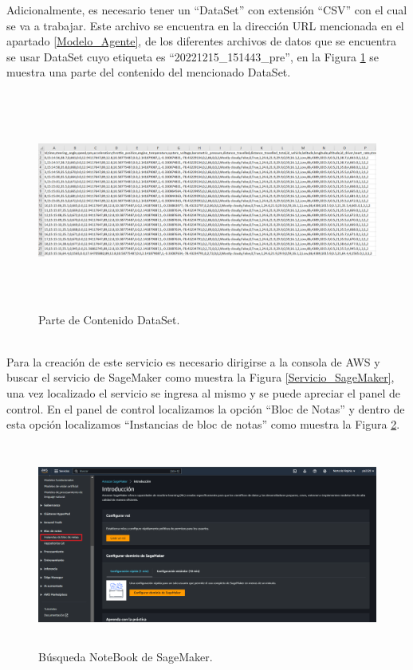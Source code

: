 \documentclass[a4paper,10pt, oneside, titlepage]{article}
\begin{document}
	 \indent Adicionalmente, es necesario tener un ``DataSet'' con extensión ``CSV'' con el cual se va a trabajar. Este archivo se encuentra en la dirección URL mencionada en el apartado \ref{Modelo_Agente}, de los diferentes archivos de datos que se encuentra se usar DataSet cuyo etiqueta es ``20221215\_151443\_pre'', en la Figura \ref{Dataset_Sagemaker} se muestra una parte del contenido del mencionado DataSet.
	\begin{figure}[!h]
		\centering
		\includegraphics[width = 1\linewidth, height = 7.2cm]{Dataset_Sagemaker.png}
		\caption{Parte de Contenido DataSet.}
		\label{Dataset_Sagemaker}
	\end{figure} \\
	\indent Para la creación de este servicio es necesario dirigirse a la consola de AWS y buscar el servicio de SageMaker como muestra la Figura \ref{Servicio_SageMaker}, una vez localizado el servicio se ingresa al mismo y se puede apreciar el panel de control. En el panel de control localizamos la opción ``Bloc de Notas'' y dentro de esta opción localizamos ``Instancias de bloc de notas'' como muestra la Figura \ref{Nootebook_SageMaker}.
	\begin{figure}[!h]
		\centering
		\includegraphics[width = 1\linewidth, height = 6.7cm]{Nootebook_SageMaker.png}
		\caption{Búsqueda NoteBook de SageMaker.}
		\label{Nootebook_SageMaker}
	\end{figure} \\
\end{document}

